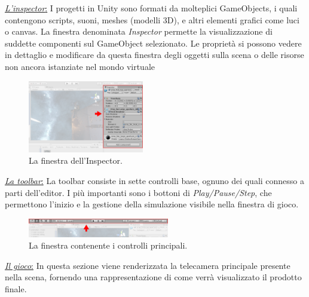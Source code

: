 \begin{flushleft}
	\underline{\textit{L'inspector}:}
	I progetti in Unity sono formati da molteplici GameObjects, i quali contengono scripts, suoni, meshes (modelli 3D), e altri elementi grafici come luci o canvas. La finestra denominata \textit{Inspector} permette la visualizzazione di suddette componenti sul GameObject selezionato. Le proprietà si possono vedere in dettaglio e modificare da questa finestra degli oggetti sulla scena o delle risorse non ancora istanziate nel mondo virtuale
\end{flushleft}

\begin{figure}[H]
	\includegraphics[width=0.45\textwidth]{figure/Inspector}
	\centering
	\caption{La finestra dell'Inspector.}
\end{figure}

\newpage

\begin{flushleft}
	\underline{\textit{La toolbar}:}
	La toolbar consiste in sette controlli base, ognuno dei quali connesso a parti dell'editor. I più importanti sono i bottoni di \textit{Play/Pause/Step}, che permettono l'inizio e la gestione della simulazione visibile nella finestra di gioco. 
	
\end{flushleft}

\begin{figure}[H]
	\includegraphics[width=0.55\textwidth]{figure/Toolbar}
	\centering
	\caption{La finestra contenente i controlli principali.}
\end{figure}

\begin{flushleft}
	\underline{\textit{Il gioco}:}
	In questa sezione viene renderizzata la telecamera principale presente nella scena, fornendo una rappresentazione di come verrà visualizzato il prodotto finale.
\end{flushleft}

